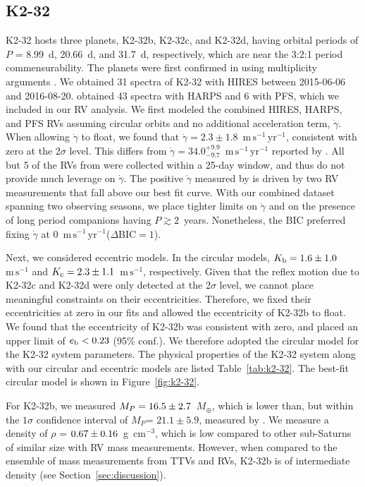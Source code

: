 \documentclass[preprint2]{aastex6}
\newcommand{\Mp}{\ensuremath{M_{P}}\xspace}
\newcommand{\ms}{\ensuremath{\mathrm{m}\,\mathrm{s}^{-1}}\xspace}
\newcommand{\msyr}{\ensuremath{\mathrm{m}\,\mathrm{s}^{-1}\,\mathrm{yr}^{-1}}\xspace}
\newcommand{\Me}{\ensuremath{M_{\oplus}}\xspace}
\newcommand{\gcc}{g~cm$^{-3}$\xspace}
\newcommand{\dvdt}{\ensuremath{\dot{\gamma}}\xspace}
\newcommand{\K}[1]{\ensuremath{K_\mathrm{#1}}\xspace}
\newcommand{\e}[1]{\ensuremath{e_\mathrm{#1}}\xspace}
\newcommand{\dbic}{\ensuremath{\Delta\mathrm{BIC}}\xspace}
\begin{document}
\subsection{K2-32}
\label{ssec:k2-32}
K2-32 hosts three planets, K2-32b, K2-32c, and K2-32d, having orbital periods of $P$ = 8.99~d, 20.66~d, and 31.7~d, respectively, which are near the 3:2:1 period commensurability. The planets were first confirmed in \cite{Sinukoff16} using multiplicity arguments \citep{Lissauer12}. We obtained 31 spectra of K2-32 with HIRES between 2015-06-06 and 2016-08-20. \cite{Dai16} obtained 43 spectra with HARPS and 6 with PFS, which we included in our RV analysis. We first modeled the combined HIRES, HARPS, and PFS RVs assuming circular orbits and no additional acceleration term, \dvdt. When allowing \dvdt to float, we found that $\dvdt = 2.3 \pm 1.8 $~\msyr, consistent with zero at the 2$\sigma$ level. This differs from $\dvdt = 34.0^{+9.9}_{-9.7}$~\msyr reported by \cite{Dai16}. All but 5 of the RVs from \cite{Dai16} were collected within a 25-day window, and thus do not provide much leverage on \dvdt. The positive \dvdt measured by \cite{Dai16} is driven by two RV measurements that fall above our best fit curve. With our combined dataset spanning two observing seasons, we place tighter limits on \dvdt and on the presence of long period companions having $P \gtrsim 2$~years. Nonetheless, the BIC preferred fixing \dvdt at 0~\msyr ($\dbic = 1$).

Next, we considered eccentric models. In the circular models, $\K{b} = \val{K2-32-circ}{k2}$~\ms and $\K{c} = \val{K2-32-circ}{k3}$~\ms, respectively. Given that the reflex motion due to K2-32c and K2-32d were only detected at the 2$\sigma$ level, we cannot place meaningful constraints on their eccentricities. Therefore, we fixed their eccentricities at zero in our fits and allowed the eccentricity of K2-32b to float. We found that the eccentricity of K2-32b was consistent with zero, and placed an upper limit of $\e{b} < \val{K2-32-ecc}{eul1}$ (95\% conf.). We therefore adopted the circular model for the K2-32 system parameters. The physical properties of the K2-32 system along with our circular and eccentric models are listed Table~\ref{tab:k2-32}. The best-fit circular model is shown in Figure~\ref{fig:k2-32}.

For K2-32b, we measured $\Mp = \val{K2-32-circ}{Mpsini1}$~\Me, which is lower than, but within the $1\sigma$ confidence interval of \Mp = $21.1 \pm 5.9$, measured by \cite{Dai16}. We measure a density of $\rho$ = $\val{K2-32-circ}{rhop1}$~\gcc, which is low compared to other sub-Saturns of similar size with RV mass measurements. However, when compared to the ensemble of mass measurements from TTVs and RVs, K2-32b is of intermediate density (see Section~\ref{sec:discussion}). 
\end{document}
